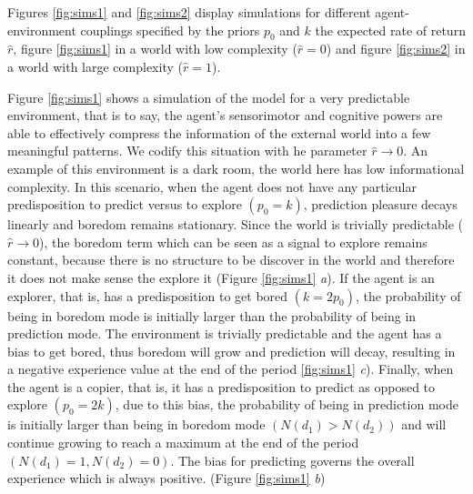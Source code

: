 \documentclass[11pt, onecolumn]{article}
\begin{document}

Figures \ref{fig:sims1} and \ref{fig:sims2} display simulations for different agent-environment couplings specified by the priors $p_0$ and $k$ the expected rate of return $\hat{r}$, figure \ref{fig:sims1} in a world with low complexity ($\hat{r} =0$) and  figure \ref{fig:sims2} in a world with large complexity ($\hat{r}=1$).

Figure \ref{fig:sims1} shows a simulation of the model for a very predictable environment, that is to say, the agent's sensorimotor and cognitive powers are able to effectively compress the information of the external world into a few meaningful patterns. We codify this situation with he parameter $\hat{r} \to 0$. An example of this environment is a dark room, the world here has low informational complexity.
In this scenario, when the agent does not have any particular predisposition to predict versus to explore $(p_0 = k)$, prediction pleasure decays linearly and boredom remains stationary. Since the world is trivially predictable ($\hat{r} \to 0$), the boredom term which can be seen as a signal to explore remains constant, because there is no structure to be discover in the world and therefore it does not make sense the explore it (Figure \ref{fig:sims1} \emph{a}). %
If the agent is an explorer, that is, has a predisposition to get bored $(k = 2p_0)$, the probability of being in boredom mode is initially larger than the probability of being in prediction mode. The environment is trivially predictable and the agent has a bias to get bored, thus boredom will grow and prediction will decay, resulting in a negative experience value at the end of the period \ref{fig:sims1} \emph{c}). %
Finally, when the agent is a copier, that is, it has a predisposition to predict as opposed to explore $(p_0 = 2k)$, due to this bias, the probability of being in prediction mode is initially larger than being in boredom mode $(N(d_1) > N(d_2))$ and will continue growing to reach a maximum at the end of the period  $(N(d_1) =1,  N(d_2) =0)$. The bias for predicting governs the overall experience which is always positive. (Figure \ref{fig:sims1} \emph{b}) %
\end{document}
